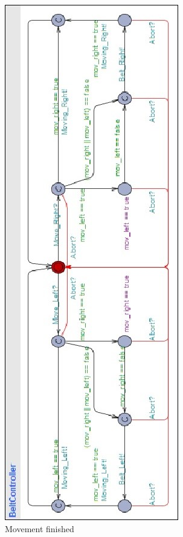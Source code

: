 \documentclass[a4paper,oneside,11pt]{report}
\begin{document}
\begin{figure}
\centering
\includegraphics[height=0.75\textheight]{images/BCT1.jpg}
\caption{Movement finished}
\label{fig:bct2}
\end{figure}

\clearpage  %
\end{document}
